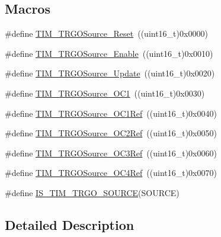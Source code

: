 \subsection*{Macros}
\begin{DoxyCompactItemize}
\item 
\#define \hyperlink{group___t_i_m___trigger___output___source_gafb039ed39279a4d1134b234797b1cdfb}{T\+I\+M\+\_\+\+T\+R\+G\+O\+Source\+\_\+\+Reset}~((uint16\+\_\+t)0x0000)
\item 
\#define \hyperlink{group___t_i_m___trigger___output___source_gaa228ba6cfafcf676e33e3ee35cb7fc1c}{T\+I\+M\+\_\+\+T\+R\+G\+O\+Source\+\_\+\+Enable}~((uint16\+\_\+t)0x0010)
\item 
\#define \hyperlink{group___t_i_m___trigger___output___source_ga8a73c717070ab1a0ef90326780f20aef}{T\+I\+M\+\_\+\+T\+R\+G\+O\+Source\+\_\+\+Update}~((uint16\+\_\+t)0x0020)
\item 
\#define \hyperlink{group___t_i_m___trigger___output___source_ga2d044b472c021f5484b9f71eb9ca69f1}{T\+I\+M\+\_\+\+T\+R\+G\+O\+Source\+\_\+\+O\+C1}~((uint16\+\_\+t)0x0030)
\item 
\#define \hyperlink{group___t_i_m___trigger___output___source_ga7cb70a2a026dc02136bdbb3dcc483d6c}{T\+I\+M\+\_\+\+T\+R\+G\+O\+Source\+\_\+\+O\+C1\+Ref}~((uint16\+\_\+t)0x0040)
\item 
\#define \hyperlink{group___t_i_m___trigger___output___source_ga059f9f6cf96c833180eb3cdf5e56bd04}{T\+I\+M\+\_\+\+T\+R\+G\+O\+Source\+\_\+\+O\+C2\+Ref}~((uint16\+\_\+t)0x0050)
\item 
\#define \hyperlink{group___t_i_m___trigger___output___source_ga40943bc1c3f22b983c683cbf0e87a218}{T\+I\+M\+\_\+\+T\+R\+G\+O\+Source\+\_\+\+O\+C3\+Ref}~((uint16\+\_\+t)0x0060)
\item 
\#define \hyperlink{group___t_i_m___trigger___output___source_gafc81561599199912d613c65f760919bc}{T\+I\+M\+\_\+\+T\+R\+G\+O\+Source\+\_\+\+O\+C4\+Ref}~((uint16\+\_\+t)0x0070)
\item 
\#define \hyperlink{group___t_i_m___trigger___output___source_gadf4e4e0422bd9c108b184884781d2d46}{I\+S\+\_\+\+T\+I\+M\+\_\+\+T\+R\+G\+O\+\_\+\+S\+O\+U\+R\+CE}(S\+O\+U\+R\+CE)
\end{DoxyCompactItemize}


\subsection{Detailed Description}


